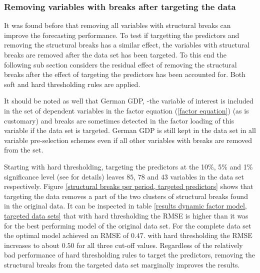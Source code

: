 \documentclass[12pt]{article}
\begin{document}
\subsubsection{Removing variables with breaks after targeting the data}
It was found before that removing all variables with structural breaks can improve the forecasting performance. To test if targetting the predictors and removing the structural breaks has a similar effect, the variables with structural breaks are removed after the data set has been targeted. To this end the following sub section considers the residual effect of removing the structural breaks after the effect of targeting the predictors has been accounted for. Both soft and hard thresholding rules are applied.

It should be noted as well that German GDP, -the variable of interest is included in the set of dependent variables in the factor equation (\ref{factor equation}) (as is customary) and breaks are sometimes detected in the factor loading of this variable if the data set is targeted. German GDP is still kept in the data set in all variable pre-selection schemes even if all other variables with breaks are removed from the set.

Starting with hard thresholding, targeting the predictors at the 10\%, 5\% and 1\% significance level (see \citet{bai2008forecasting} for details) leaves $85$, $78$ and $43$ variables in the data set respectively. Figure \ref{structural breaks per period, targeted predictors} shows that targeting the data removes a part of the two clusters of structural breaks found in the original data. It can be inspected in table \ref{results dynamic factor model, targeted data sets} that with hard thresholding the RMSE is higher than it was for the best performing model of the original data set. For the complete data set the optimal model achieved an RMSE of $0.47$. with hard thresholding the RMSE increases to about $0.50$ for all three cut-off values. Regardless of the relatively bad performance of hard thresholding rules to target the predictors, removing the structural breaks from the targeted data set marginally improves the results.
\end{document}
